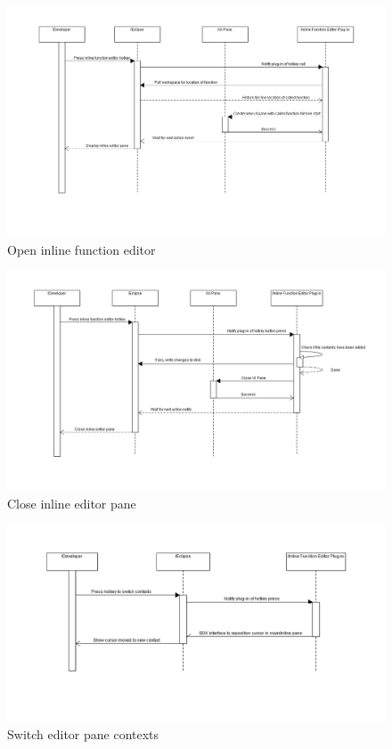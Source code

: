 \documentclass[]{report}
\begin{document}
	\begin{figure}[h!]
		\includegraphics[width=\linewidth]{imgs/open_editor.png}
		\caption{Open inline function editor}
	\end{figure}
	
	\begin{figure}[h]
		\includegraphics[width=\linewidth]{imgs/close_editor.png}
		\caption{Close inline editor pane}
	\end{figure}

	\begin{figure}
		\includegraphics[width=\linewidth]{imgs/switch_context.png}
		\caption{Switch editor pane contexts}
	\end{figure}
\end{document}
